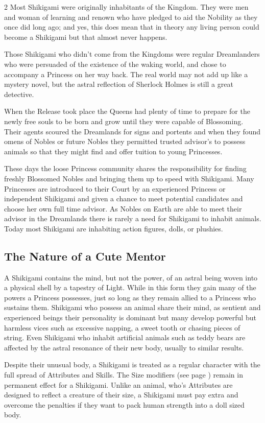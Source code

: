 \begin{multicols}{2}
Most Shikigami were originally inhabitants of the Kingdom. They were men and woman of learning and renown who have pledged to aid the Nobility as they once did long ago; and yes, this does mean that in theory any living person could become a Shikigami but that almost never happens.

Those Shikigami who didn't come from the Kingdoms were regular Dreamlanders who were persuaded of the existence of the waking world, and chose to accompany a Princess on her way back. The real world may not add up like a mystery novel, but the astral reflection of Sherlock Holmes is still a great detective.

When the Release took place the Queens had plenty of time to prepare for the newly free souls to be born and grow until they were capable of Blossoming. Their agents scoured the Dreamlands for signs and portents and when they found omens of Nobles or future Nobles they permitted trusted advisor’s to possess animals so that they might find and offer tuition to young Princesses.

These days the loose Princess community shares the responsibility for finding freshly Blossomed Nobles and bringing them up to speed with Shikigami. Many Princesses are introduced to their Court by an experienced Princess or independent Shikigami and given a chance to meet potential candidates and choose her own full time advisor. As Nobles on Earth are able to meet their advisor in the Dreamlands there is rarely a need for Shikigami to inhabit animals. Today most Shikigami are inhabiting action figures, dolls, or plushies.

\subsection*{The Nature of a Cute Mentor}

A Shikigami contains the mind, but not the power, of an astral being woven into a physical shell by a tapestry of Light. While in this form they gain many of the powers a Princess possesses, just so long as they remain allied to a Princess who sustains them. Shikigami who possess an animal share their mind, as sentient and experienced beings their personality is dominant but many develop powerful but harmless vices such as excessive napping, a sweet tooth or chasing pieces of string. Even Shikigami who inhabit artificial animals such as teddy bears are affected by the astral resonance of their new body, usually to similar results. 

Despite their unusual body, a Shikigami is treated as a regular character with the full spread of Attributes and Skills. The Size modifiers (see page \pageref{SizeTable}) remain in permanent effect for a Shikigami. Unlike an animal, who's Attributes are designed to reflect a creature of their size, a Shikigami must pay extra and overcome the penalties if they want to pack human strength into a doll sized body.


\end{multicols}
